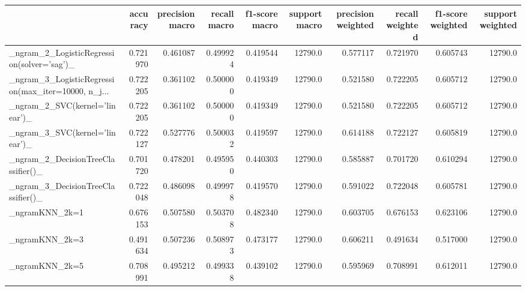 \begin{tabular}{lrrrrrrrrr}
\toprule
{} &  accuracy &  precision macro &  recall macro &  f1-score macro &  support macro &  precision weighted &  recall weighted &  f1-score weighted &  support weighted \\
\midrule
\_ngram\_2\_LogisticRegression(solver='sag')\_         &  0.721970 &         0.461087 &      0.499924 &        0.419544 &        12790.0 &            0.577117 &         0.721970 &           0.605743 &           12790.0 \\
\_ngram\_3\_LogisticRegression(max\_iter=10000, n\_j... &  0.722205 &         0.361102 &      0.500000 &        0.419349 &        12790.0 &            0.521580 &         0.722205 &           0.605712 &           12790.0 \\
\_ngram\_2\_SVC(kernel='linear')\_                     &  0.722205 &         0.361102 &      0.500000 &        0.419349 &        12790.0 &            0.521580 &         0.722205 &           0.605712 &           12790.0 \\
\_ngram\_3\_SVC(kernel='linear')\_                     &  0.722127 &         0.527776 &      0.500032 &        0.419597 &        12790.0 &            0.614188 &         0.722127 &           0.605819 &           12790.0 \\
\_ngram\_2\_DecisionTreeClassifier()\_                 &  0.701720 &         0.478201 &      0.495950 &        0.440303 &        12790.0 &            0.585887 &         0.701720 &           0.610294 &           12790.0 \\
\_ngram\_3\_DecisionTreeClassifier()\_                 &  0.722048 &         0.486098 &      0.499978 &        0.419570 &        12790.0 &            0.591022 &         0.722048 &           0.605781 &           12790.0 \\
\_ngramKNN\_2k=1                                     &  0.676153 &         0.507580 &      0.503708 &        0.482340 &        12790.0 &            0.603705 &         0.676153 &           0.623106 &           12790.0 \\
\_ngramKNN\_2k=3                                     &  0.491634 &         0.507236 &      0.508973 &        0.473177 &        12790.0 &            0.606211 &         0.491634 &           0.517000 &           12790.0 \\
\_ngramKNN\_2k=5                                     &  0.708991 &         0.495212 &      0.499338 &        0.439102 &        12790.0 &            0.595969 &         0.708991 &           0.612011 &           12790.0 \\

\end{tabular}
